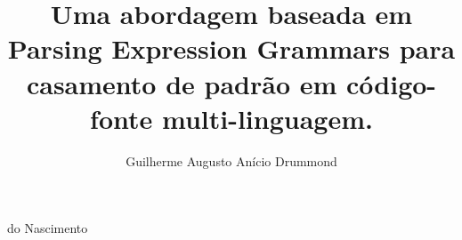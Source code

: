 \documentclass[mscexam,numbers]{coppe}
\begin{document}
  \title{Uma abordagem baseada em Parsing Expression Grammars para casamento de padrão em código-fonte multi-linguagem.}
  \author{Guilherme Augusto Anício Drummond}{do Nascimento}
  

  \keyword{---}
  \maketitle

  
  
  
  
  \renewcommand{\nomname}{Lista de Abreviações}
  \tableofcontents
  \listoffigures
  \listoftables
  \printlosymbols
  \printnomenclature
  

  \mainmatter
  
  
  
  
  
  

  \backmatter
  
  

  \appendix
  
\end{document}
